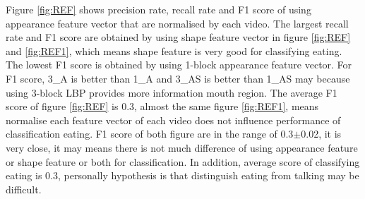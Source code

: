 Figure \ref{fig:REF} shows precision rate, recall rate and F1 score of using appearance feature vector that are normalised by each video. The largest recall rate and F1 score are obtained by using shape feature vector in figure \ref{fig:REF} and \ref{fig:REF1}, which means shape feature is very good for classifying eating. The lowest F1 score is obtained by using 1-block appearance feature vector. For F1 score, 3\_A is better than 1\_A and 3\_AS is better than 1\_AS may because using 3-block LBP provides more information mouth region. The average F1 score of figure \ref{fig:REF} is 0.3, almost the same figure \ref{fig:REF1}, means normalise each feature vector of each video does not influence performance of classification eating. F1 score of both figure are in the range of 0.3$\pm$0.02, it is very close, it may means there is not much difference of using appearance feature or shape feature or both for classification. In addition,  average score of classifying eating is 0.3, personally hypothesis is that distinguish eating from talking may be difficult. 
